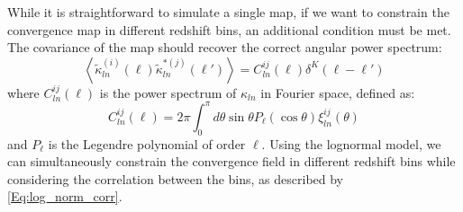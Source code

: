 \documentclass{aa}
\begin{document}
While it is straightforward to simulate a single map, if we want to constrain the convergence map in different redshift bins, an additional condition must be met. The covariance of the map should recover the correct angular power spectrum:
\begin{equation}\label{power_spectrum_definition}
    \left \langle \tilde{\kappa}^{(i)}_{ln} (\ell)\tilde{\kappa}^{*(j)}_{ln}(\ell')\right \rangle =C^{ij}_{ln}(\ell)\delta^{K}(\ell-\ell')
\end{equation}
where $ C^{ij}_{ln}(\ell)$ is the power spectrum of $\kappa_{ln}$ in Fourier space, defined as:
\begin{equation}\label{Eq:log_norm_cls}
    C^{ij}_{ln}(\ell)=2\pi \int_0^{\pi} d\theta \sin{\theta}P_{\ell}(\cos{\theta})\xi^{ij}_{ln}(\theta)
\end{equation}
and $P_{\ell}$ is the Legendre polynomial of order $\ell$. 
Using the lognormal model, we can simultaneously constrain the convergence field in different redshift bins while considering the correlation between the bins, as described by \autoref{Eq:log_norm_corr}.
\end{document}
